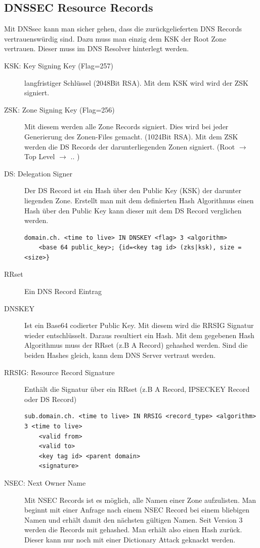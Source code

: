 \clearpage

\subsection{DNSSEC Resource Records}
Mit DNSsec kann man sicher gehen, dass die zurückgelieferten DNS Records vertrauenswürdig sind. Dazu muss man einzig dem KSK der Root Zone vertrauen. Dieser muss im DNS Resolver hinterlegt werden.
\begin{description}
	\item[KSK: Key Signing Key (Flag=257)] langfristiger Schlüssel (2048Bit RSA). Mit dem KSK wird wird der ZSK signiert.
	\item[ZSK: Zone Signing Key (Flag=256)] Mit diesem werden alle Zone Records signiert. Dies wird bei jeder Generierung des Zonen-Files gemacht. (1024Bit RSA). Mit dem ZSK werden die DS Records der darunterliegenden Zonen signiert. (Root $\rightarrow$ Top Level $\rightarrow$ .. ) 
	\item[DS: Delegation Signer] 
	Der DS Record ist ein Hash über den Public Key (KSK) der darunter liegenden Zone. Erstellt man mit dem definierten Hash Algorithmus einen Hash über den Public Key kann dieser mit dem DS Record verglichen werden.
	\begin{lstlisting}[caption=DNSKEY]
	domain.ch. <time to live> IN DNSKEY <flag> 3 <algorithm>
	<base 64 public_key>; {id=<key tag id> (zks|ksk), size = <size>}
	\end{lstlisting}
	\item[RRset] Ein DNS Record Eintrag
	\item[DNSKEY] Ist ein Base64 codierter Public Key. Mit diesem wird die RRSIG Signatur wieder entschlüsselt. Daraus resultiert ein Hash. Mit dem gegebenen Hash Algorithmus muss der RRset (z.B A Record) gehashed werden. Sind die beiden Hashes gleich, kann dem DNS Server vertraut werden.
	\item[RRSIG: Resource Record Signature] Enthält die Signatur über ein RRset (z.B A Record, IPSECKEY Record oder DS Record)
	\begin{lstlisting}[caption=RRSIG]
	sub.domain.ch. <time to live> IN RRSIG <record_type> <algorithm> 3 <time to live>
	<valid from>
	<valid to>
	<key tag id> <parent domain>
	<signature>
	\end{lstlisting}
	\item[NSEC: Next Owner Name] Mit NSEC Records ist es möglich, alle Namen einer Zone aufzulisten. Man beginnt mit einer Anfrage nach einem NSEC Record bei einem bliebigen Namen und erhält damit den nächsten gültigen Namen. Seit Version 3 werden die Records mit gehashed. Man erhält also einen Hash zurück. Dieser kann nur noch mit einer Dictionary Attack geknackt werden.
\end{description}

